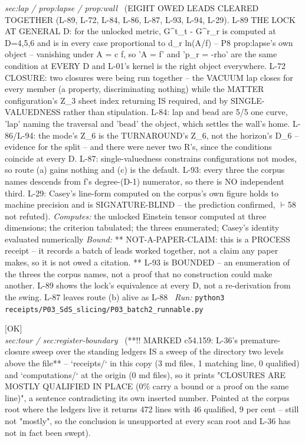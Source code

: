 \begin{description}
\textit{sec:lap / prop:lapse / prop:wall} \ (EIGHT OWED LEADS CLEARED TOGETHER (L-89, L-72, L-84, L-86, L-87, L-93, L-94, L-29). L-89 THE LOCK AT GENERAL D: for the unlocked metric, G\textasciicircum{}t\_t - G\textasciicircum{}r\_r is computed at D=4,5,6 and is in every case proportional to d\_r ln(A/f) -- P8 prop:lapse's own object -- vanishing under A = c f, so 'A = f' and 'p\_r = -rho' are the same condition at EVERY D and L-01's kernel is the right object everywhere. L-72 CLOSURE: two closures were being run together -- the VACUUM lap closes for every member (a property, discriminating nothing) while the MATTER configuration's Z\_3 sheet index returning IS required, and by SINGLE-VALUEDNESS rather than stipulation. L-84: lap and bead are 5/5 one curve, 'lap' naming the traversal and 'bead' the object, which settles the wall's home. L-86/L-94: the mode's Z\_6 is the TURNAROUND's Z\_6, not the horizon's D\_6 -- evidence for the split -- and there were never two R's, since the conditions coincide at every D. L-87: single-valuedness constrains configurations not modes, so route (a) gains nothing and (c) is the default. L-93: every three the corpus names descends from f's degree-(D-1) numerator, so there is NO independent third. L-29: Casey's line-form computed on the corpus's own figure holds to machine precision and is SIGNATURE-BLIND -- the prediction confirmed, \ensuremath{\vdash}58 not refuted). 
\emph{Computes:} the unlocked Einstein tensor computed at three dimensions; the criterion tabulated; the threes enumerated; Casey's identity evaluated numerically
 \emph{Bound:} ** NOT-A-PAPER-CLAIM: this is a PROCESS receipt -- it records a batch of leads worked together, not a claim any paper makes, so it is not owed a citation. ** L-93 is BOUNDED -- an enumeration of the threes the corpus names, not a proof that no construction could make another. L-89 shows the lock's equivalence at every D, not a re-derivation from the swing. L-87 leaves route (b) alive as L-88
\ \emph{Run:} \texttt{python3 receipts/P03\_SdS\_slicing/P03\_batch2\_runnable.py}
\item[\label{rcpt:P03_batch3_hot_front}\texttt{P03\_batch3\_hot\_front}]\hfill\textsf{[OK]}\\
\textit{sec:tour / sec:register-boundary} \ (**!! MARKED c54.159: L-36's premature-closure sweep over the standing ledgers IS a sweep of the directory two levels above the file** -- `receipts/` in this copy (3 md files, 1 matching line, 0 qualified) and `computations/` at the origin (0 md files), so it prints "CLOSURES ARE MOSTLY QUALIFIED IN PLACE (0\% carry a bound or a proof on the same line)", a sentence contradicting its own inserted number. Pointed at the corpus root where the ledgers live it returns 472 lines with 46 qualified, 9 per cent -- still not "mostly", so the conclusion is unsupported at every scan root and L-36 has not in fact been swept). 

\end{description}
